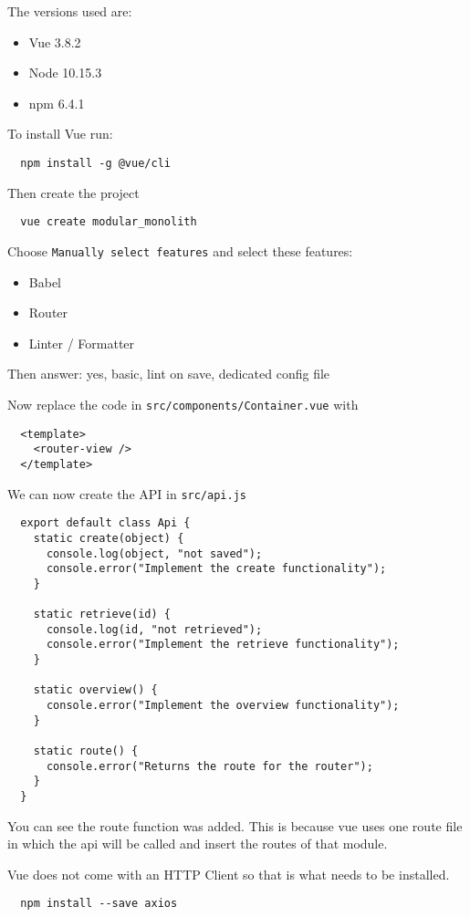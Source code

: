 The versions used are:
\begin{itemize}
  \item Vue 3.8.2
  \item Node 10.15.3
  \item npm 6.4.1
\end{itemize}

To install Vue run:
\begin{verbatim}
  npm install -g @vue/cli
\end{verbatim}


Then create the project
\begin{verbatim}
  vue create modular_monolith
\end{verbatim}

Choose \texttt{Manually select features} and select these features:
\begin{itemize}
  \item Babel
  \item Router
  \item Linter / Formatter
\end{itemize}

Then answer: yes, basic, lint on save, dedicated config file

Now replace the code in \texttt{src/components/Container.vue} with
\begin{verbatim}
  <template>
    <router-view />
  </template>
\end{verbatim}

We can now create the API in \texttt{src/api.js}
\begin{verbatim}
  export default class Api {
    static create(object) {
      console.log(object, "not saved");
      console.error("Implement the create functionality");
    }

    static retrieve(id) {
      console.log(id, "not retrieved");
      console.error("Implement the retrieve functionality");
    }

    static overview() {
      console.error("Implement the overview functionality");
    }
    
    static route() {
      console.error("Returns the route for the router");
    }
  }
\end{verbatim}

You can see the route function was added. This is because vue uses one route file in which the api will be called and insert the routes of that module.

Vue does not come with an HTTP Client so that is what needs to be installed.
\begin{verbatim}
  npm install --save axios
\end{verbatim}

